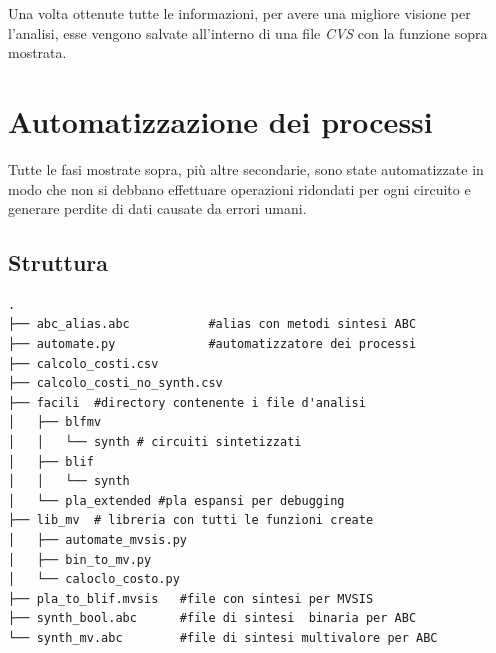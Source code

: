 \documentclass[
  italian,
]{book}
\begin{document}
Una volta ottenute tutte le informazioni, per avere una migliore visione per l'analisi, esse vengono salvate all'interno di una file \emph{CVS} con la funzione sopra mostrata.

\newpage

\hypertarget{automatizzazione-dei-processi}{%
\section{Automatizzazione dei processi}\label{automatizzazione-dei-processi}}

Tutte le fasi mostrate sopra, più altre secondarie, sono state automatizzate in modo che non si debbano effettuare operazioni ridondati per ogni circuito e generare perdite di dati causate da errori umani.

\hypertarget{struttura}{%
\subsection{Struttura}\label{struttura}}

\begin{verbatim}
.
├── abc_alias.abc           #alias con metodi sintesi ABC
├── automate.py             #automatizzatore dei processi
├── calcolo_costi.csv
├── calcolo_costi_no_synth.csv
├── facili  #directory contenente i file d'analisi
│   ├── blfmv
│   │   └── synth # circuiti sintetizzati
│   ├── blif
│   │   └── synth
│   └── pla_extended #pla espansi per debugging
├── lib_mv  # libreria con tutti le funzioni create
│   ├── automate_mvsis.py
│   ├── bin_to_mv.py
│   └── caloclo_costo.py
├── pla_to_blif.mvsis   #file con sintesi per MVSIS
├── synth_bool.abc      #file di sintesi  binaria per ABC
└── synth_mv.abc        #file di sintesi multivalore per ABC
\end{verbatim}
\end{document}
